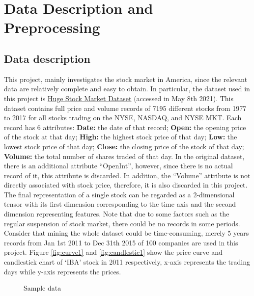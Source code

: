 \chapter{Data Description and Preprocessing}
\label{ch:data}

\section{Data description}
This project, mainly investigates the stock market in America, since the relevant data are relatively complete and easy to obtain. In particular, the dataset used in this project is \hyperlink{https://www.kaggle.com/borismarjanovic/price-volume-data-for-all-us-stocks-etfs}{Huge Stock Market Dataset} (accessed in May 8th 2021). This dataset contains full price and volume records of 7195 different stocks from 1977 to 2017 for all stocks trading on the NYSE, NASDAQ, and NYSE MKT. Each record has 6 attributes: \textbf{Date:} the date of that record; \textbf{Open:} the opening price of the stock at that day; \textbf{High:} the highest stock price of that day; \textbf{Low:} the lowest stock price of that day; \textbf{Close:} the closing price of the stock of that day; \textbf{Volume:} the total number of shares traded of that day. In the original dataset, there is an additional attribute ``OpenInt'', however, since there is no actual record of it, this attribute is discarded. In addition, the ``Volume'' attribute is not directly associated with stock price, therefore, it is also discarded in this project. The final representation of a single stock can be regarded as a 2-dimensional tensor with its first dimension corresponding to the time axis and the second dimension representing features. Note that due to some factors such as the regular suspension of stock market, there could be no records in some periods. Consider that mining the whole dataset could be time-consuming, merely 5 years records from Jan 1st 2011 to Dec 31th 2015 of 100 companies are used in this project. Figure \ref{fig:curve1} and \ref{fig:candlestic1} show the price curve and candlestick chart of `IBA' stock in 2011 respectively, x-axis represents the trading days while y-axis represents the prices.
\begin{figure}[!htbp]
    \centering 
    \caption{ Sample data } 
    \label{fig:sample1} 
\end{figure} 

